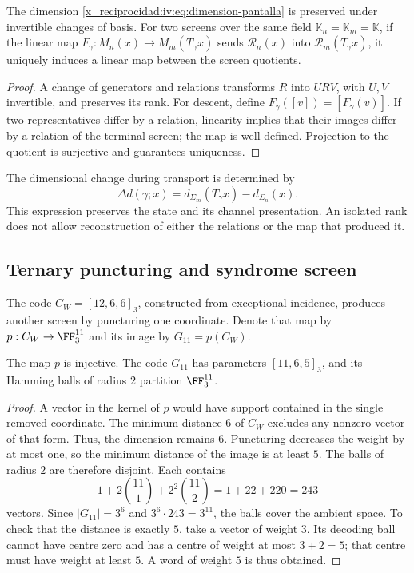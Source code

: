 \begin{proposition}
\label{x_reciprocidad:iv:prop:pantalla-transporte}
The dimension \eqref{x_reciprocidad:iv:eq:dimension-pantalla} is preserved
under invertible changes of basis. For two screens over the same field
\(\mathbb K_n=\mathbb K_m=\mathbb K\), if the linear map
\(F_\gamma:M_n(x)\to M_m(T_\gamma x)\) sends
\(\mathcal R_n(x)\) into \(\mathcal R_m(T_\gamma x)\), it uniquely
induces a linear map between the screen quotients.
\end{proposition}
\begin{proof}
A change of generators and relations transforms \(R\) into
\(URV\), with \(U,V\) invertible, and preserves its rank. For
descent, define
\(\overline F_\gamma([v])=[F_\gamma(v)]\). If two
representatives differ by a relation, linearity implies that their images differ
by a relation of the terminal screen; the map is
well defined. Projection to the quotient is surjective and
guarantees uniqueness.
\end{proof}

The dimensional change during transport is determined
by
\[
 \Delta d(\gamma;x)=d_{\Sigma_m}(T_\gamma x)
                         -d_{\Sigma_n}(x).
\]
This expression preserves the state and its channel presentation.
An isolated rank does not allow reconstruction of either the relations or
the map that produced it.

\subsection{Ternary puncturing and syndrome screen}

The code \(C_W=[12,6,6]_3\), constructed from
exceptional incidence, produces another screen by
puncturing one coordinate. Denote
that map by \(p:C_W\to\FF_3^{11}\) and
its image by \(G_{11}=p(C_W)\).

\begin{proposition}
\label{x_reciprocidad:iv:prop:codigo-once}
The map \(p\) is injective. The code \(G_{11}\) has
parameters \([11,6,5]_3\), and its Hamming balls of radius
\(2\) partition \(\FF_3^{11}\).
\end{proposition}
\begin{proof}
A vector in the kernel of \(p\) would have support contained in
the single removed coordinate. The minimum distance \(6\)
of \(C_W\) excludes any nonzero vector of that form.
Thus, the dimension remains \(6\). Puncturing decreases
the weight by at most one, so the minimum distance
of the image is at least \(5\). The balls of radius \(2\)
are therefore disjoint. Each contains
\[
 1+2\binom{11}{1}+2^2\binom{11}{2}
 =1+22+220=243
\]
vectors. Since \(|G_{11}|=3^6\) and
\(3^6\cdot243=3^{11}\), the balls cover the ambient space.
To check that the distance is exactly \(5\),
take a vector of weight \(3\). Its decoding ball
cannot have centre zero and has a centre of weight at
most \(3+2=5\); that centre must have weight at least
\(5\). A word of weight \(5\) is thus obtained.
\end{proof}

